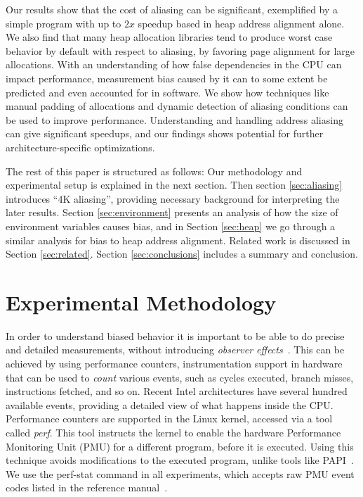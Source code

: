 \documentclass[prodmode,acmtaco]{acmsmall}
\begin{document}
Our results show that the cost of aliasing can be significant, exemplified by a simple program with up to $2x$ speedup based in heap address alignment alone.
We also find that many heap allocation libraries tend to produce worst case behavior by default with respect to aliasing, by favoring page alignment for large allocations.
With an understanding of how false dependencies in the CPU can impact performance, measurement bias caused by it can to some extent be predicted and even accounted for in software.
We show how techniques like manual padding of allocations and dynamic detection of aliasing conditions can be used to improve performance. 
Understanding and handling address aliasing can give significant speedups, and our findings shows potential for further architecture-specific optimizations.

The rest of this paper is structured as follows: Our methodology and experimental setup is explained in the next section.
Then section \ref{sec:aliasing} introduces ``4K aliasing'', providing necessary background for interpreting the later results.
Section \ref{sec:environment} presents an analysis of how the size of environment variables causes bias, and in Section \ref{sec:heap} we go through a similar analysis for bias to heap address alignment.
Related work is discussed in Section \ref{sec:related}.
Section \ref{sec:conclusions} includes a summary and conclusion.


\section{Experimental Methodology}
\label{sec:methodology}
In order to understand biased behavior it is important to be able to do precise and detailed measurements, without introducing \emph{observer effects}~\cite{Mytkowicz:2008:OE&MB}.
This can be achieved by using performance counters, instrumentation support in hardware that can be used to \emph{count} various events, such as cycles executed, branch misses, instructions fetched, and so on.
Recent Intel architectures have several hundred available events, providing a detailed view of what happens inside the CPU.
Performance counters are supported in the Linux kernel, accessed via a tool called \emph{perf}.
This tool instructs the kernel to enable the hardware Performance Monitoring Unit (PMU) for a different program, before it is executed.
Using this technique avoids modifications to the executed program, unlike tools like PAPI~\cite{PAPI:PortableInterface}.
We use the perf-stat command in all experiments, which accepts raw PMU event codes listed in the reference manual~\cite{Volume3B}.
\end{document}
